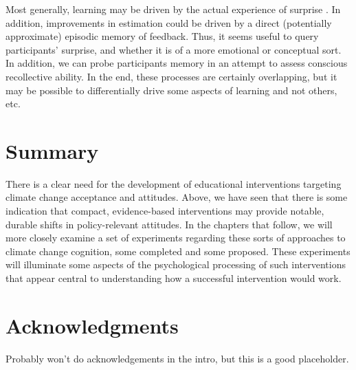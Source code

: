Most generally, learning may be driven by the actual experience of surprise
\cite[e.g.,][]{munnich_longevities_2005}.  In addition, improvements in estimation could be
driven by a direct (potentially approximate) episodic memory of feedback. Thus,
it seems useful to query participants' surprise, and whether it is of a more
emotional or conceptual sort. In addition, we can probe participants memory in
an attempt to assess conscious recollective ability. In the end, these processes
are certainly overlapping, but it may be possible to differentially drive some
aspects of learning and not others, etc.

\section{Summary}

There is a clear need for the development of educational interventions targeting
climate change acceptance and attitudes. Above, we have seen that there is some
indication that compact, evidence-based interventions may provide notable,
durable shifts in policy-relevant attitudes. In the chapters that follow, we
will more closely examine a set of experiments regarding these sorts of
approaches to climate change cognition, some completed and some proposed. These
experiments will illuminate some aspects of the psychological processing of such
interventions that appear central to understanding how a successful intervention
would work.

\section*{Acknowledgments}

Probably won't do acknowledgements in the intro, but this is a good placeholder.


